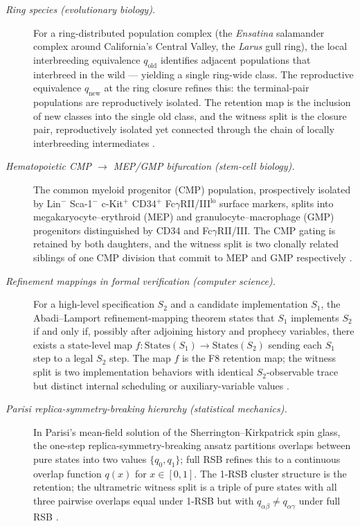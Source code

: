 \documentclass[11pt]{article}
\theoremstyle{definition}
\begin{document}
\begin{description}
\item[\emph{Ring species (evolutionary biology).}]
For a ring-distributed population complex (the \emph{Ensatina}
salamander complex around California's Central Valley, the
\emph{Larus} gull ring), the local interbreeding equivalence
\(q_{\mathrm{old}}\) identifies adjacent populations that interbreed
in the wild --- yielding a single ring-wide class.  The reproductive
equivalence \(q_{\mathrm{new}}\) at the ring closure refines this:
the terminal-pair populations are reproductively isolated.  The
retention map is the inclusion of new classes into the single old
class, and the witness split is the closure pair, reproductively
isolated yet connected through the chain of locally interbreeding
intermediates \citep{IrwinBenschPrice2001SpeciationInARing}.

\item[\emph{Hematopoietic CMP \(\to\) MEP/GMP bifurcation (stem-cell
biology).}]
The common myeloid progenitor (CMP) population, prospectively
isolated by Lin\(^{-}\) Sca-1\(^{-}\) c-Kit\(^{+}\) CD34\(^{+}\)
Fc\(\gamma\)RII/III\(^{\mathrm{lo}}\) surface markers, splits into
megakaryocyte--erythroid (MEP) and granulocyte--macrophage (GMP)
progenitors distinguished by CD34 and Fc\(\gamma\)RII/III.  The CMP
gating is retained by both daughters, and the witness split is two
clonally related siblings of one CMP division that commit to MEP and
GMP respectively \citep{AkashiTraverMiyamotoWeissman2000CMPClonogenic}.

\item[\emph{Refinement mappings in formal verification (computer
science).}]
For a high-level specification \(S_2\) and a candidate implementation
\(S_1\), the Abadi--Lamport refinement-mapping theorem states that
\(S_1\) implements \(S_2\) if and only if, possibly after adjoining
history and prophecy variables, there exists a state-level map
\(f:\mathrm{States}(S_1)\to\mathrm{States}(S_2)\) sending each \(S_1\)
step to a legal \(S_2\) step.  The map \(f\) is the F8 retention map;
the witness split is two implementation behaviors with identical
\(S_2\)-observable trace but distinct internal scheduling or
auxiliary-variable values
\citep{AbadiLamport1991RefinementMappings}.

\item[\emph{Parisi replica-symmetry-breaking hierarchy (statistical
mechanics).}]
In Parisi's mean-field solution of the Sherrington--Kirkpatrick spin
glass, the one-step replica-symmetry-breaking ansatz partitions
overlaps between pure states into two values \(\{q_0,q_1\}\); full RSB
refines this to a continuous overlap function \(q(x)\) for
\(x\in[0,1]\).  The 1-RSB cluster structure is the retention; the
ultrametric witness split is a triple of pure states with all three
pairwise overlaps equal under 1-RSB but with
\(q_{\alpha\beta}\ne q_{\alpha\gamma}\) under full RSB
\citep{Parisi1983OrderParameterSpinGlasses}.


\end{description}
\end{document}
